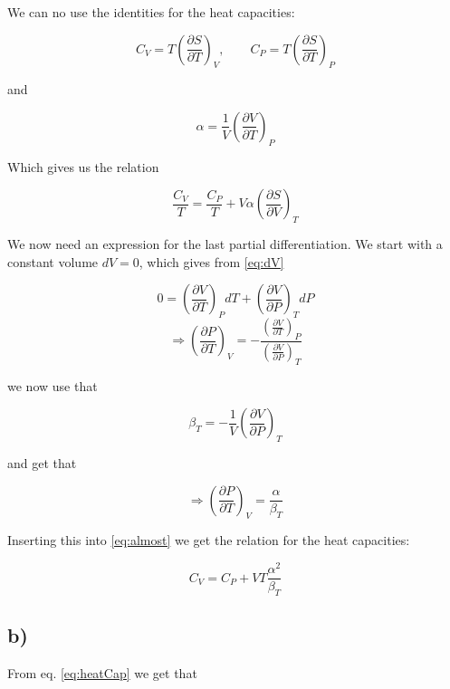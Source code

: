 \documentclass[a4paper,norsk, 10pt]{article}
\newcommand{\pd}[2]{\frac{\partial #1}{\partial #2}}
\begin{document}
We can no use the identities for the heat capacities:

\begin{equation}
C_V = T\left(\pd{S}{T}\right)_V, \qquad C_P = T\left(\pd{S}{T}\right)_P
\label{eq:heatCap}
\end{equation}

and

\begin{equation}
\alpha = \frac{1}{V}\left(\pd{V}{T}\right)_P
\label{eq:alpha}
\end{equation}

Which gives us the relation

\begin{equation}
\frac{C_V}{T} = \frac{C_P}{T} + V\alpha \left(\pd{S}{V}\right)_T
\label{eq:almost}
\end{equation}

We now need an expression for the last partial differentiation. We start with a constant volume $dV = 0$, which gives from \eqref{eq:dV}

\begin{equation}
0 = \left(\pd{V}{T}\right)_P dT + \left(\pd{V}{P}\right)_T dP
\end{equation}
\begin{equation}
\Rightarrow \left(\pd{P}{T}\right)_V = - \frac{\left(\pd{V}{T}\right)_P}{\left(\pd{V}{P}\right)_T}
\end{equation}

we now use that 

\begin{equation}
\beta_T = -\frac{1}{V}\left(\pd{V}{P}\right)_T
\end{equation}

and get that

\begin{equation}
\Rightarrow \left(\pd{P}{T}\right)_V = \frac{\alpha}{\beta_T}
\end{equation}

Inserting this into \eqref{eq:almost} we get the relation for the heat capacities:

\begin{equation}
C_V = C_P + VT\frac{\alpha^2}{\beta_T}
\end{equation}

\subsection{b)}

From eq. \eqref{eq:heatCap} we get that
\end{document}
